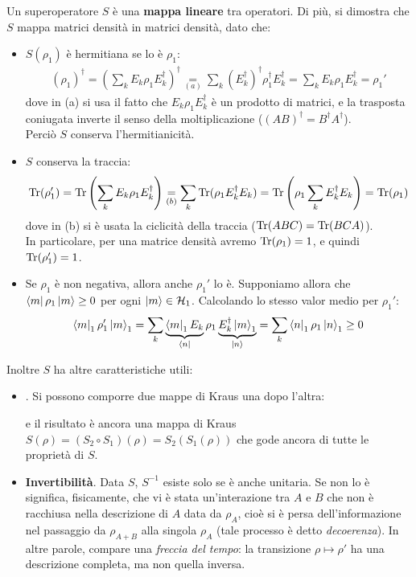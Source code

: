 \documentclass[../../InformazioneQuantistica.tex]{subfiles}
\begin{document}
Un superoperatore $S$ è una \textbf{mappa lineare} tra operatori. Di più, si dimostra che $S$ mappa matrici densità in matrici densità, dato che:
\begin{itemize}
\item $S(\rho_1)$ è hermitiana se lo è $\rho_1$:
\begin{align*}
(\rho_1)^\dag = \left( \sum_k E_k \rho_1 E_k^\dag\right)^\dag \underset{(a)}{=} \sum_k (E_k^\dag)^\dag \rho_1^\dag E_k^\dag = \sum_k E_k \rho_1 E_k^\dag = \rho_1'
\end{align*}
dove in (a) si usa il fatto che $E_k \rho_1 E_k^\dag$ è un prodotto di matrici, e la trasposta coniugata inverte il senso della moltiplicazione ($(AB)^\dag = B^\dag A^\dag$).\\
Perciò $S$ conserva l'hermitianicità.
\item $S$ conserva la traccia:
\begin{align*}
\operatorname{Tr}(\rho_1') = \operatorname{Tr}\left(\sum_k E_k \rho_1 E_k^\dag \right) \underset{(b)}{=} \sum_k \operatorname{Tr}(\rho_1 E_k^\dag E_k) = \operatorname{Tr}\left(\rho_1 \sum_k E_k^\dag E_k \right) = \operatorname{Tr}(\rho_1)
\end{align*}
dove in (b) si è usata la ciclicità della traccia ($\operatorname{Tr}(ABC)=\operatorname{Tr}(BCA)$).\\
In particolare, per una matrice densità avremo $\operatorname{Tr}(\rho_1)=1$, e quindi $\operatorname{Tr}(\rho_1')=1$.
\item Se $\rho_1$ è non negativa, allora anche $\rho_1'$ lo è. Supponiamo allora che $\Bra{m}\rho_1 \Ket{m}\geq 0$ per ogni $\Ket{m} \in \mathcal{H}_1$. Calcolando lo stesso valor medio per $\rho_1'$:
\begin{align*}
\Bra{m}_1 \rho_1' \Ket{m}_1 = \sum_k \underbrace{\Bra{m}_1 E_k}_{\Bra{n}} \rho_1 \underbrace{E_k^\dag \Ket{m}_1}_{\Ket{n}} = \sum_k \Bra{n}_1 \rho_1 \Ket{n}_1 \geq 0 
\end{align*}
\end{itemize}

Inoltre $S$ ha altre caratteristiche utili:
\begin{itemize}
\item \textbf{}. Si possono comporre due mappe di Kraus una dopo l'altra:

e il risultato è ancora una mappa di Kraus $S(\rho) = (S_2 \circ S_1)(\rho) = S_2(S_1(\rho))$ che gode ancora di tutte le proprietà di $S$.


\item \textbf{Invertibilità}. Data $S$, $S^{-1}$ esiste solo se è anche unitaria. Se non lo è significa, fisicamente, che vi è stata un'interazione tra $A$ e $B$ che non è racchiusa nella descrizione di $A$ data da $\rho_A$, cioè si è persa dell'informazione nel passaggio da $\rho_{A+B}$ alla singola $\rho_A$ (tale processo è detto \textit{decoerenza}). In altre parole, compare una \textit{freccia del tempo}: la transizione $\rho \mapsto \rho'$ ha una descrizione completa, ma non quella inversa.
\end{itemize}
\end{document}
